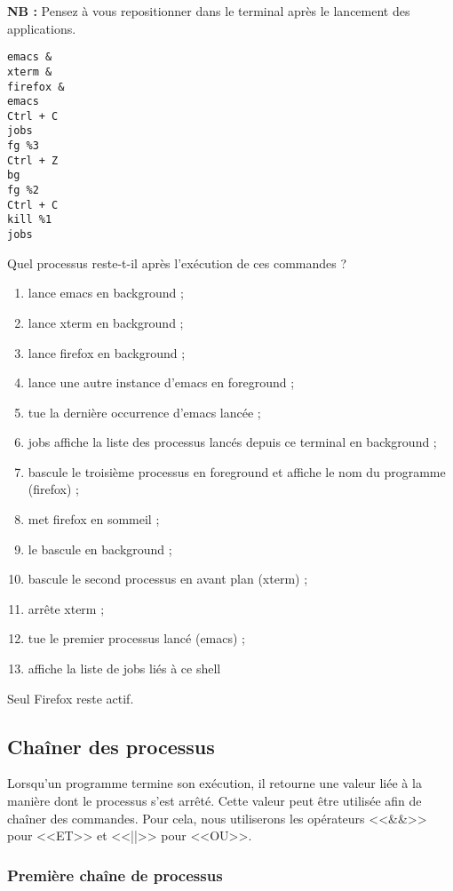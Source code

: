 \documentclass[11pt]{article}
\begin{document}
\noindent \textbf{NB :} Pensez à vous repositionner dans le terminal après le lancement des applications.

\begin{lstlisting}
emacs &
xterm &
firefox &
emacs
Ctrl + C
jobs
fg %3
Ctrl + Z
bg
fg %2
Ctrl + C
kill %1
jobs
\end{lstlisting}

Quel processus reste-t-il après l’exécution de ces commandes ?

\begin{solution}
 \begin{enumerate}
  \item lance emacs en background ;
  \item lance xterm en background ;
  \item lance firefox en background ;
  \item lance une autre instance d'emacs en foreground ;
  \item tue la dernière occurrence d'emacs lancée ;
  \item jobs affiche la liste des processus lancés depuis ce terminal en background ;
  \item bascule le troisième processus en foreground et affiche le nom du programme (firefox) ;
  \item met firefox en sommeil ;
  \item le bascule en background ;
  \item bascule le second processus en avant plan (xterm) ;
  \item arrête xterm ;
  \item tue le premier processus lancé (emacs) ;
  \item affiche la liste de jobs liés à ce shell
 \end{enumerate}

 Seul Firefox reste actif.

\end{solution}

\subsection{Chaîner des processus}

Lorsqu'un programme termine son exécution, il retourne une valeur liée à la manière dont le processus s'est arrêté. Cette valeur peut être utilisée afin de chaîner des commandes. Pour cela, nous utiliserons les opérateurs <<\&\&>> pour <<ET>> et <<||>> pour <<OU>>.

\subsubsection{Première chaîne de processus}
\end{document}

